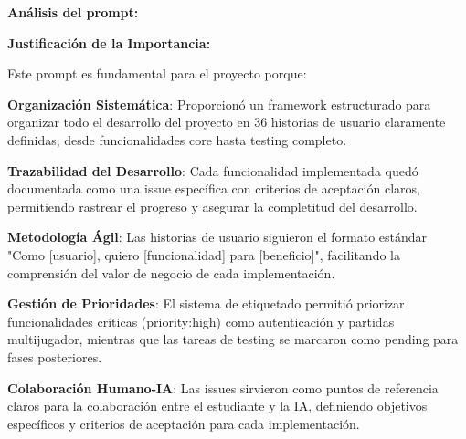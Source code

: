 \documentclass[12pt,a4paper]{article}
\begin{document}
\textbf{Análisis del prompt:}

\textbf{Justificación de la Importancia:}

Este prompt es fundamental para el proyecto porque:

\textbf{Organización Sistemática}: Proporcionó un framework estructurado para organizar todo el desarrollo del proyecto en 36 historias de usuario claramente definidas, desde funcionalidades core hasta testing completo.

\textbf{Trazabilidad del Desarrollo}: Cada funcionalidad implementada quedó documentada como una issue específica con criterios de aceptación claros, permitiendo rastrear el progreso y asegurar la completitud del desarrollo.

\textbf{Metodología Ágil}: Las historias de usuario siguieron el formato estándar "Como [usuario], quiero [funcionalidad] para [beneficio]", facilitando la comprensión del valor de negocio de cada implementación.

\textbf{Gestión de Prioridades}: El sistema de etiquetado permitió priorizar funcionalidades críticas (priority:high) como autenticación y partidas multijugador, mientras que las tareas de testing se marcaron como pending para fases posteriores.

\textbf{Colaboración Humano-IA}: Las issues sirvieron como puntos de referencia claros para la colaboración entre el estudiante y la IA, definiendo objetivos específicos y criterios de aceptación para cada implementación.
\end{document}
